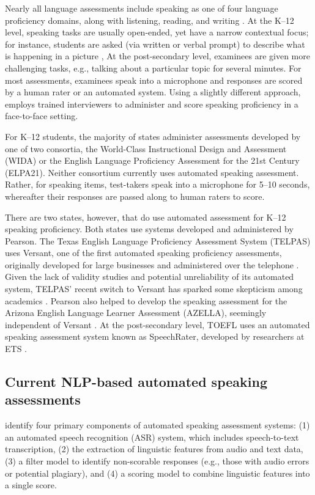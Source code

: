 \documentclass [PhD] {uclathes}
\begin{document}
Nearly all language assessments include speaking as one of four language proficiency domains, along with listening, reading, and writing \citep{ccsso2012framework}. At the K–12 level, speaking tasks are usually open-ended, yet have a narrow contextual focus; for instance, students are asked (via written or verbal prompt) to describe what is happening in a picture \citep{luoma2004assessing}, At the post-secondary level, examinees are given more challenging tasks, e.g., talking about a particular topic for several minutes. For most assessments, examinees speak into a microphone and responses are scored by a human rater or an automated system. Using a slightly different approach, \citet{ielts2023} employs trained interviewers to administer and score speaking proficiency in a face-to-face setting.

For K–12 students, the majority of states administer assessments developed by one of two consortia, the World-Class Instructional Design and Assessment (WIDA) or the English Language Proficiency Assessment for the 21st Century (ELPA21). Neither consortium currently uses automated speaking assessment. Rather, for speaking items, test-takers speak into a microphone for 5–10 seconds, whereafter their responses are passed along to human raters to score.

There are two states, however, that do use automated assessment for K–12 speaking proficiency. Both states use systems developed and administered by Pearson. The Texas English Language Proficiency Assessment System (TELPAS) uses Versant, one of the first automated speaking proficiency assessments, originally developed for large businesses and administered over the telephone \citep{pearson2019versant}. Given the lack of validity studies and potential unreliability of its automated system, TELPAS’ recent switch to Versant has sparked some skepticism among academics \citep{collier2020test}. Pearson also helped to develop the speaking assessment for the Arizona English Language Learner Assessment (AZELLA), seemingly independent of Versant \citep{johnston2019using}. At the post-secondary level, TOEFL uses an automated speaking assessment system known as SpeechRater, developed by researchers at ETS \citep{chen2018automated}.

\subsection{Current NLP-based automated speaking assessments}

\citet{chen2018automated} identify four primary components of automated speaking assessment systems: (1) an automated speech recognition (ASR) system, which includes speech-to-text transcription, (2) the extraction of linguistic features from audio and text data, (3) a filter model to identify non-scorable responses (e.g., those with audio errors or potential plagiary), and (4) a scoring model to combine linguistic features into a single score.
\end{document}
